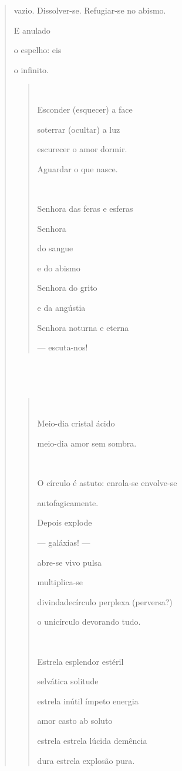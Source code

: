 \begin{verse}
vazio. Dissolver-se. Refugiar-se no abismo.

E anulado

o espelho: eis

o infinito.

\begin{quote}


Esconder (esquecer) a face

soterrar (ocultar) a luz

escurecer o amor dormir.

Aguardar o que nasce.



Senhora das feras e esferas

Senhora

do sangue

e do abismo

Senhora do grito

e da angústia

Senhora noturna e eterna

--- escuta-nos!
\end{quote}

\subsection{}\label{section-13}

\begin{quote}


Meio-dia cristal ácido

meio-dia amor sem sombra.



O círculo é astuto: enrola-se envolve-se

autofagicamente.

Depois explode

--- galáxias! ---

abre-se vivo pulsa

multiplica-se

divindadecírculo perplexa (perversa?)

o unicírculo devorando tudo.



Estrela esplendor estéril

selvática solitude

estrela inútil ímpeto energia

amor casto ab soluto

estrela estrela lúcida demência

dura estrela explosão pura.


\end{quote}
\end{verse}
